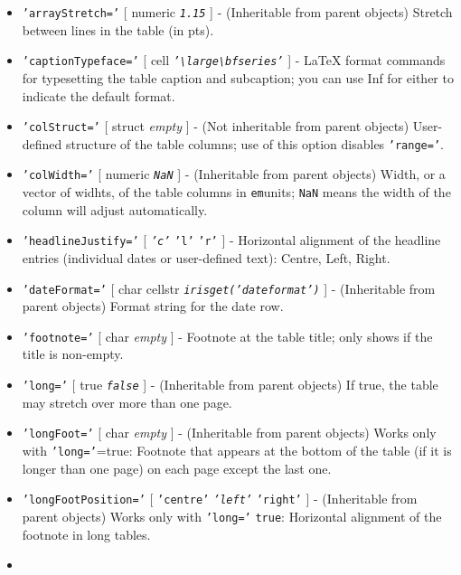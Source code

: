 \begin{itemize}
\item
  \texttt{'arrayStretch='} {[} numeric \textbar{} \emph{\texttt{1.15}}
  {]} - (Inheritable from parent objects) Stretch between lines in the
  table (in pts).
\item
  \texttt{'captionTypeface='} {[} cell \textbar{}
  \emph{\texttt{'\textbackslash{}large\textbackslash{}bfseries'}} {]} -
  LaTeX format commands for typesetting the table caption and
  subcaption; you can use Inf for either to indicate the default format.
\item
  \texttt{'colStruct='} {[} struct \textbar{} \emph{empty} {]} - (Not
  inheritable from parent objects) User-defined structure of the table
  columns; use of this option disables \texttt{'range='}.
\item
  \texttt{'colWidth='} {[} numeric \textbar{} \emph{\texttt{NaN}} {]} -
  (Inheritable from parent objects) Width, or a vector of widhts, of the
  table columns in \texttt{em}units; \texttt{NaN} means the width of the
  column will adjust automatically.
\item
  \texttt{'headlineJustify='} {[} \emph{\texttt{'c'}} \textbar{}
  \texttt{'l'} \textbar{} \texttt{'r'} {]} - Horizontal alignment of the
  headline entries (individual dates or user-defined text): Centre,
  Left, Right.
\item
  \texttt{'dateFormat='} {[} char \textbar{} cellstr \textbar{}
  \emph{\texttt{irisget('dateformat')}} {]} - (Inheritable from parent
  objects) Format string for the date row.
\item
  \texttt{'footnote='} {[} char \textbar{} \emph{empty} {]} - Footnote
  at the table title; only shows if the title is non-empty.
\item
  \texttt{'long='} {[} true \textbar{} \emph{\texttt{false}} {]} -
  (Inheritable from parent objects) If true, the table may stretch over
  more than one page.
\item
  \texttt{'longFoot='} {[} char \textbar{} \emph{empty} {]} -
  (Inheritable from parent objects) Works only with
  \texttt{'long='}=true: Footnote that appears at the bottom of the
  table (if it is longer than one page) on each page except the last
  one.
\item
  \texttt{'longFootPosition='} {[} \texttt{'centre'} \textbar{}
  \emph{\texttt{'left'}} \textbar{} \texttt{'right'} {]} - (Inheritable
  from parent objects) Works only with \texttt{'long='} \texttt{true}:
  Horizontal alignment of the footnote in long tables.
\item

\end{itemize}

